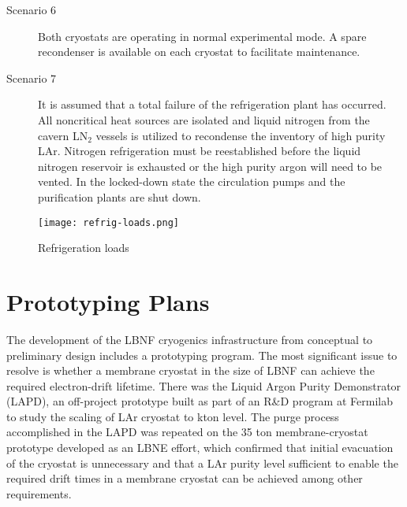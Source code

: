 \begin{description}
\item[Scenario 6]
Both cryostats are operating in normal experimental mode. A spare 
recondenser is available on each cryostat to facilitate maintenance.

\item[Scenario 7]
It is assumed that a total failure of the refrigeration plant has 
occurred. All noncritical heat sources are isolated and liquid 
nitrogen from the cavern LN$_2$ vessels is utilized to recondense 
the inventory of high purity LAr. Nitrogen refrigeration must be 
reestablished before the liquid nitrogen reservoir is exhausted 
or the high purity argon will need to be vented. In the locked-down 
state the circulation pumps and the purification plants are shut down.
\end{description}

\begin{figure}[htbp]
\centering
\texttt{[image: refrig-loads.png]}
\caption{Refrigeration loads}
\label{fig:Refrigeration-loads}
\end{figure}

\begin{figure}[htbp]
\centering
\end{figure}


\chapter{Prototyping Plans}
\label{sec:cryo-cryosys-proto-plans}


The development of the LBNF cryogenics infrastructure from conceptual 
to preliminary design includes a prototyping program. The most 
significant issue to resolve is whether a membrane cryostat in
the size of LBNF can achieve the required electron-drift lifetime. 
There was the Liquid Argon Purity Demonstrator (LAPD), an 
off-project prototype built as part of an R\&D program at 
Fermilab to study the scaling of LAr cryostat to kton
level. The purge process accomplished in the LAPD was 
repeated on the 35 ton membrane-cryostat prototype 
developed as an LBNE effort, which confirmed that initial 
evacuation of the cryostat is unnecessary and that 
a LAr purity level sufficient to enable the required 
drift times in a membrane cryostat can be achieved 
among other requirements.

